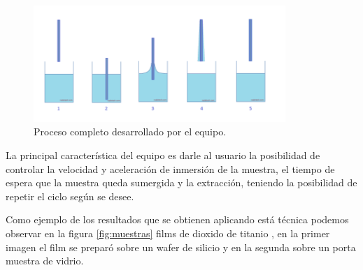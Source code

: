 \begin{figure}[htpb]
\centering 
\includegraphics[width=0.85\textwidth]{./Figures/dip-coating.png}
\caption{Proceso completo desarrollado por el equipo.}
\label{fig:inmersion}
\end{figure}

 
La principal característica del equipo es darle al usuario la posibilidad de controlar la velocidad y aceleración de inmersión de la muestra, el tiempo de espera que la muestra queda sumergida y la extracción, teniendo la posibilidad de repetir el ciclo según se desee.

Como ejemplo de los resultados que se obtienen aplicando está técnica podemos observar en la figura \ref{fig:muestras} films de dioxido de titanio , en la primer imagen el film se preparó sobre un wafer de silicio y en la segunda sobre un porta muestra de vidrio.


